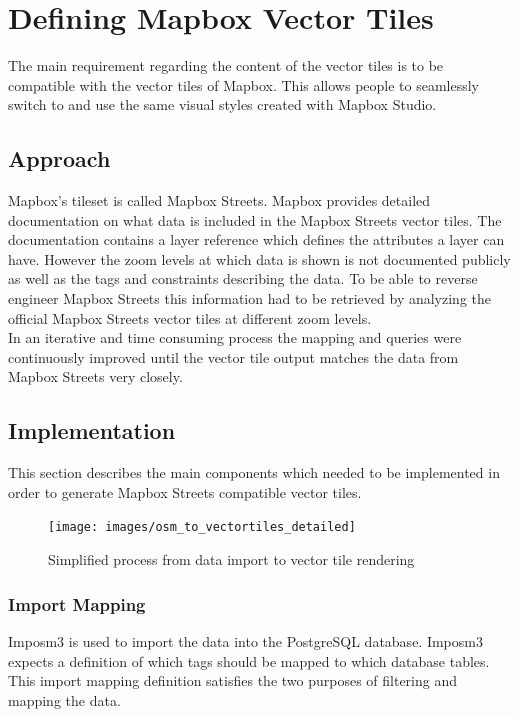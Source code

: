 \chapter{Defining Mapbox Vector Tiles}\label{chapter_defining_mapbox_vector_tiles}

The main requirement regarding the content of the vector tiles is to be compatible with the vector tiles of Mapbox. This allows people to seamlessly switch to \osmvt{} and use the same visual styles created with Mapbox Studio. 

\section{Approach}
Mapbox's tileset is called Mapbox Streets. Mapbox provides detailed documentation on what data is included in the Mapbox Streets vector tiles. The documentation contains a layer reference which defines the attributes a layer can have. However the zoom levels at which data is shown is not documented publicly as well as the \osm{} tags and constraints describing the data. To be able to reverse engineer Mapbox Streets this information had to be retrieved by analyzing the official Mapbox Streets vector tiles at different zoom levels.\\
In an iterative and time consuming process the mapping and queries were continuously improved until the vector tile output matches the data from Mapbox Streets very closely.

\section{Implementation}
This section describes the main components which needed to be implemented in order to generate Mapbox Streets compatible vector tiles.

\begin{figure}[H]
\centering
\texttt{[image: images/osm\_to\_vectortiles\_detailed]}
\caption{Simplified process from data import to vector tile rendering}
\end{figure}

\clearpage

\subsection{Import Mapping}

Imposm3\cite{4_github_2015} is used to import the \osm{} data into the PostgreSQL database. Imposm3 expects a definition of which \osm{} tags should be mapped to which database tables. This import mapping definition satisfies the two purposes of filtering and mapping the data.

